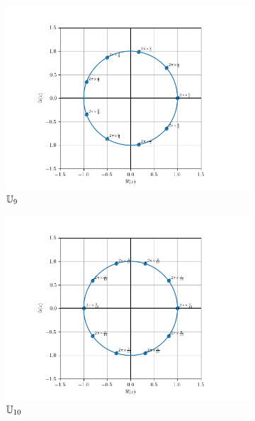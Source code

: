 \begin{figure}
\begin{subfigure}{.3\textwidth}
      \includegraphics[scale=.33]{U_9.png}  
      \caption{$\mathbb{U}_9$}
      \label{fig:U9}      
    \end{subfigure}
    \begin{subfigure}{.3\textwidth}
      \centering
      \includegraphics[scale=.33]{U_10.png}  
      \caption{$\mathbb{U}_{10}$}
      \label{fig:U10}
    \end{subfigure}  
    \begin{subfigure}{.3\textwidth}
      \centering

\end{subfigure}
\end{figure}
